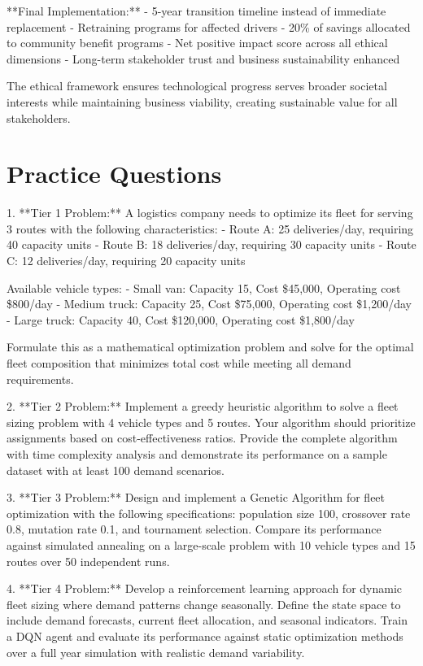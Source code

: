 \documentclass{article}
\begin{document}
**Final Implementation:**
- 5-year transition timeline instead of immediate replacement
- Retraining programs for affected drivers
- 20\% of savings allocated to community benefit programs
- Net positive impact score across all ethical dimensions
- Long-term stakeholder trust and business sustainability enhanced

The ethical framework ensures technological progress serves broader societal interests while maintaining business viability, creating sustainable value for all stakeholders.

\section{Practice Questions}

1. **Tier 1 Problem:** A logistics company needs to optimize its fleet for serving 3 routes with the following characteristics:
   - Route A: 25 deliveries/day, requiring 40 capacity units
   - Route B: 18 deliveries/day, requiring 30 capacity units  
   - Route C: 12 deliveries/day, requiring 20 capacity units
   
   Available vehicle types:
   - Small van: Capacity 15, Cost \$45,000, Operating cost \$800/day
   - Medium truck: Capacity 25, Cost \$75,000, Operating cost \$1,200/day
   - Large truck: Capacity 40, Cost \$120,000, Operating cost \$1,800/day
   
   Formulate this as a mathematical optimization problem and solve for the optimal fleet composition that minimizes total cost while meeting all demand requirements.

2. **Tier 2 Problem:** Implement a greedy heuristic algorithm to solve a fleet sizing problem with 4 vehicle types and 5 routes. Your algorithm should prioritize assignments based on cost-effectiveness ratios. Provide the complete algorithm with time complexity analysis and demonstrate its performance on a sample dataset with at least 100 demand scenarios.

3. **Tier 3 Problem:** Design and implement a Genetic Algorithm for fleet optimization with the following specifications: population size 100, crossover rate 0.8, mutation rate 0.1, and tournament selection. Compare its performance against simulated annealing on a large-scale problem with 10 vehicle types and 15 routes over 50 independent runs.

4. **Tier 4 Problem:** Develop a reinforcement learning approach for dynamic fleet sizing where demand patterns change seasonally. Define the state space to include demand forecasts, current fleet allocation, and seasonal indicators. Train a DQN agent and evaluate its performance against static optimization methods over a full year simulation with realistic demand variability.
\end{document}
